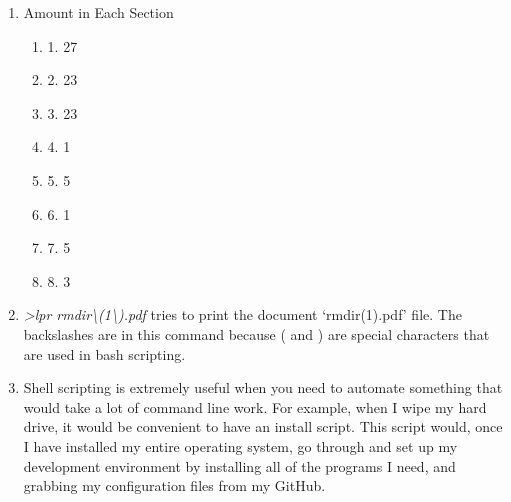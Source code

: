 \documentclass[12pt]{extarticle}
\begin{document}
\begin{enumerate}
\begin{multicols}{3}
\begin{enumerate}
					\item[] chmod 1 1 2 3 
					\item[] chown 1 1 2 3 
					\item[] stdio.h 7 
					\item[] stdlib.h 7 
					\item[] mv 1 1 
					\item[] rm 1 1 
					\item[] cp 1 1 
					\item[] bash 1 
					\item[] sh 1 1 
					\item[] zsh 1 
					\item[] env 1 1 
					\item[] lpr 1 
					\item[] intro 1 2 3 4 5 6 7 8 
					\item[] wc 1 1
				\end{enumerate}
			\end{multicols}
			\item Amount in Each Section
			\begin{multicols}{3}
				\begin{enumerate}
					\item 1. 27
					\item 2. 23
					\item 3. 23
					\item 4. 1
					\item 5. 5
					\item 6. 1
					\item 7. 5
					\item 8. 3
				\end{enumerate}
			\end{multicols}
			\item \textit{\textdollar\textgreater lpr rmdir\textbackslash(1\textbackslash).pdf} tries to print the document `rmdir(1).pdf' file.  The backslashes are in this command because ( and ) are special characters that are used in bash scripting.
			\item Shell scripting is extremely useful when you need to automate something that would take a lot of command line work.  For example, when I wipe my hard drive, it would be convenient to have an install script.  This script would, once I have installed my entire operating system, go through and set up my development environment by installing all of the programs I need, and grabbing my configuration files from my GitHub.
		\end{enumerate}
\end{document}
